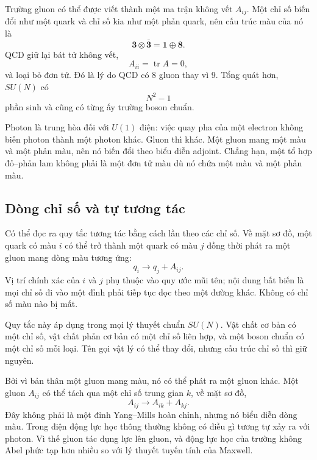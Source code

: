 Trường gluon có thể được viết thành một ma trận không vết \(A_{ij}\). Một chỉ số biến đổi như một quark và chỉ số kia như một phản quark, nên cấu trúc màu của nó là
\begin{equation}
\boldsymbol 3\otimes\bar{\boldsymbol 3}
=\boldsymbol 1\oplus\boldsymbol 8.
\end{equation}
QCD giữ lại bát tử không vết,
\begin{equation}
A_{ii}=\operatorname{tr}A=0,
\end{equation}
và loại bỏ đơn tử. Đó là lý do QCD có 8 gluon thay vì 9. Tổng quát hơn, \(SU(N)\) có
\begin{equation}
N^2-1
\end{equation}
phần sinh và cũng có từng ấy trường boson chuẩn.

Photon là trung hòa đối với \(U(1)\) điện: việc quay pha của một electron không biến photon thành một photon khác. Gluon thì khác. Một gluon mang một màu và một phản màu, nên nó biến đổi theo biểu diễn adjoint. Chẳng hạn, một tổ hợp đỏ--phản lam không phải là một đơn tử màu dù nó chứa một màu và một phản màu.

\subsection{Dòng chỉ số và tự tương tác}

Có thể đọc ra quy tắc tương tác bằng cách lần theo các chỉ số. Về mặt sơ đồ, một quark có màu \(i\) có thể trở thành một quark có màu \(j\) đồng thời phát ra một gluon mang dòng màu tương ứng:
\begin{equation}
q_i\longrightarrow q_j+A_{ij}.
\label{eq:l5-quark-gluon-vertex}
\end{equation}
Vị trí chính xác của \(i\) và \(j\) phụ thuộc vào quy ước mũi tên; nội dung bất biến là mọi chỉ số đi vào một đỉnh phải tiếp tục dọc theo một đường khác. Không có chỉ số màu nào bị mất.

Quy tắc này áp dụng trong mọi lý thuyết chuẩn \(SU(N)\). Vật chất cơ bản có một chỉ số, vật chất phản cơ bản có một chỉ số liên hợp, và một boson chuẩn có một chỉ số mỗi loại. Tên gọi vật lý có thể thay đổi, nhưng cấu trúc chỉ số thì giữ nguyên.

Bởi vì bản thân một gluon mang màu, nó có thể phát ra một gluon khác. Một gluon \(A_{ij}\) có thể tách qua một chỉ số trung gian \(k\), về mặt sơ đồ,
\begin{equation}
A_{ij}\longrightarrow A_{ik}+A_{kj}.
\label{eq:l5-three-gluon-index}
\end{equation}
Đây không phải là một đỉnh Yang--Mills hoàn chỉnh, nhưng nó biểu diễn dòng màu. Trong điện động lực học thông thường không có điều gì tương tự xảy ra với photon. Vì thế gluon tác dụng lực lên gluon, và động lực học của trường không Abel phức tạp hơn nhiều so với lý thuyết tuyến tính của Maxwell.

